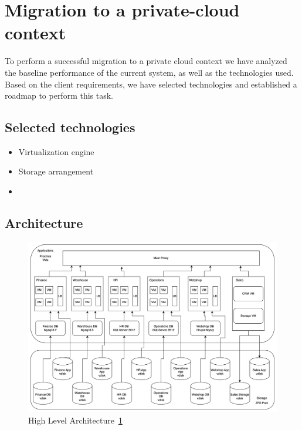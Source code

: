 \documentclass{llncs}
\begin{document}
\section{Migration to a private-cloud context}

To perform a successful migration to a private cloud context we have analyzed the baseline performance of the current system, as well as the technologies used. Based on the client requirements, we have selected technologies and established a roadmap to perform this task.   

\subsection{Selected technologies}

\begin{itemize}
  \item Virtualization engine
  \item Storage arrangement
  \item 
\end{itemize}

\newpage

\subsection{Architecture}

\begin{figure}[htbp]
  \begin{center}
    \includegraphics[width=12cm]{diagrams/architecture.drawio.png}
    \caption{High Level Architecture~\ref{High_Level_Architecture}}
    \label{High_Level_Architecture} %
  \end{center}
\end{figure}
\end{document}

